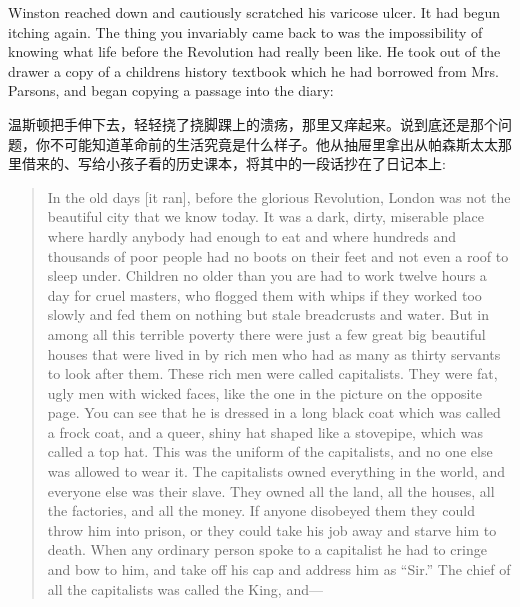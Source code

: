 \begin{paracol}{2}
\switchcolumn*

Winston reached down and cautiously scra\-tched his varicose ulcer. It had
begun itching again. The thing you invariably came back to was the
impossibility of knowing what life before the Revolution had really been
like. He took out of the drawer a copy of a children\textquotesingle s
history textbook which he had borrowed from Mrs. Parsons, and began
copying a passage into the diary:

\switchcolumn

温斯顿把手伸下去，轻轻挠了挠脚踝上的溃疡，那里又痒起来。说到底还是那个问题，你不可能知道革命前的生活究竟是什么样子。他从抽屉里拿出从帕森斯太太那里借来的、写给小孩子看的历史课本，将其中的一段话抄在了日记本上:

\switchcolumn*

\begin{quotation}
  In the old days [it ran], before the glorious Revolution, London was not
  the beautiful city that we know today. It was a dark, dirty, miserable
  place where hardly anybody had enough to eat and where hundreds and
  thousands of poor people had no boots on their feet and not even a roof to
  sleep under. Children no older than you are had to work twelve hours a day
  for cruel masters, who flogged them with whips if they worked too slowly
  and fed them on nothing but stale breadcrusts and water. But in among all
  this terrible poverty there were just a few great big beautiful houses
  that were lived in by rich men who had as many as thirty servants to look
  after them. These rich men were called capitalists. They were fat, ugly
  men with wicked faces, like the one in the picture on the opposite page.
  You can see that he is dressed in a long black coat which was called a
  frock coat, and a queer, shiny hat shaped like a stovepipe, which was
  called a top hat. This was the uniform of the capitalists, and no one else
  was allowed to wear it. The capitalists owned everything in the world, and
  everyone else was their slave. They owned all the land, all the houses,
  all the factories, and all the money. If anyone disobeyed them they could
  throw him into prison, or they could take his job away and starve him to
  death. When any ordinary person spoke to a capitalist he had to cringe and
  bow to him, and take off his cap and address him as ``Sir.'' The chief of
  all the capitalists was called the King, and---
\end{quotation}

\switchcolumn


\end{paracol}

